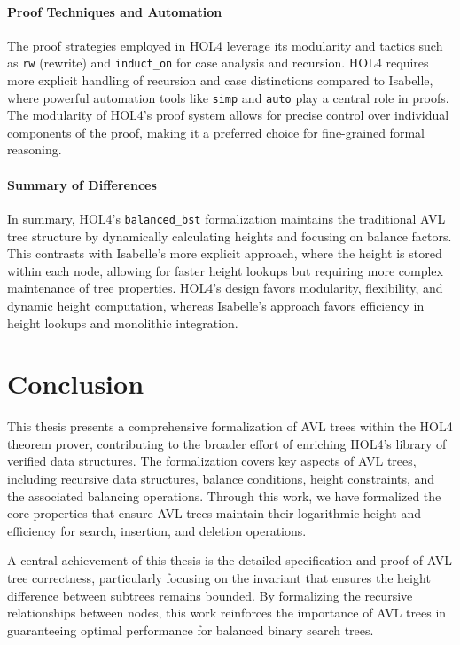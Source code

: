 \documentclass[12pt]{article}
\begin{document}
\paragraph{Proof Techniques and Automation}
The proof strategies employed in HOL4 leverage its modularity and tactics such as \texttt{rw} (rewrite) and \texttt{induct\_on} for case analysis and recursion. HOL4 requires more explicit handling of recursion and case distinctions compared to Isabelle, where powerful automation tools like \texttt{simp} and \texttt{auto} play a central role in proofs. The modularity of HOL4’s proof system allows for precise control over individual components of the proof, making it a preferred choice for fine-grained formal reasoning.

\paragraph{Summary of Differences}
In summary, HOL4’s \texttt{balanced\_bst} formalization maintains the traditional AVL tree structure by dynamically calculating heights and focusing on balance factors. This contrasts with Isabelle’s more explicit approach, where the height is stored within each node, allowing for faster height lookups but requiring more complex maintenance of tree properties. HOL4’s design favors modularity, flexibility, and dynamic height computation, whereas Isabelle’s approach favors efficiency in height lookups and monolithic integration.


\section{Conclusion}
This thesis presents a comprehensive formalization of AVL trees within the HOL4 theorem prover, contributing to the broader effort of enriching HOL4's library of verified data structures. The formalization covers key aspects of AVL trees, including recursive data structures, balance conditions, height constraints, and the associated balancing operations. Through this work, we have formalized the core properties that ensure AVL trees maintain their logarithmic height and efficiency for search, insertion, and deletion operations.

A central achievement of this thesis is the detailed specification and proof of AVL tree correctness, particularly focusing on the invariant that ensures the height difference between subtrees remains bounded. By formalizing the recursive relationships between nodes, this work reinforces the importance of AVL trees in guaranteeing optimal performance for balanced binary search trees.
\end{document}
